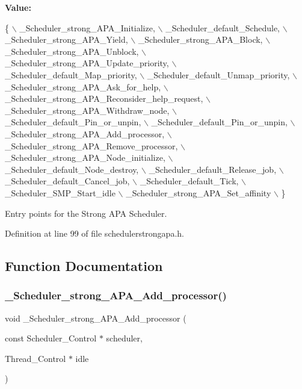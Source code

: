 {\bfseries Value\+:}
\begin{DoxyCode}
\{ \(\backslash\)
    \_Scheduler\_strong\_APA\_Initialize, \(\backslash\)
    \_Scheduler\_default\_Schedule, \(\backslash\)
    \_Scheduler\_strong\_APA\_Yield, \(\backslash\)
    \_Scheduler\_strong\_APA\_Block, \(\backslash\)
    \_Scheduler\_strong\_APA\_Unblock, \(\backslash\)
    \_Scheduler\_strong\_APA\_Update\_priority, \(\backslash\)
    \_Scheduler\_default\_Map\_priority, \(\backslash\)
    \_Scheduler\_default\_Unmap\_priority, \(\backslash\)
    \_Scheduler\_strong\_APA\_Ask\_for\_help, \(\backslash\)
    \_Scheduler\_strong\_APA\_Reconsider\_help\_request, \(\backslash\)
    \_Scheduler\_strong\_APA\_Withdraw\_node, \(\backslash\)
    \_Scheduler\_default\_Pin\_or\_unpin, \(\backslash\)
    \_Scheduler\_default\_Pin\_or\_unpin, \(\backslash\)
    \_Scheduler\_strong\_APA\_Add\_processor, \(\backslash\)
    \_Scheduler\_strong\_APA\_Remove\_processor, \(\backslash\)
    \_Scheduler\_strong\_APA\_Node\_initialize, \(\backslash\)
    \_Scheduler\_default\_Node\_destroy, \(\backslash\)
    \_Scheduler\_default\_Release\_job, \(\backslash\)
    \_Scheduler\_default\_Cancel\_job, \(\backslash\)
    \_Scheduler\_default\_Tick, \(\backslash\)
    \_Scheduler\_SMP\_Start\_idle \(\backslash\)
    \_Scheduler\_strong\_APA\_Set\_affinity \(\backslash\)
  \}
\end{DoxyCode}


Entry points for the Strong A\+PA Scheduler. 



Definition at line 99 of file schedulerstrongapa.\+h.



\subsection{Function Documentation}
\mbox{\label{group__RTEMSScoreSchedulerStrongAPA_ga6ac09dac24785561fd7c5ee5bbd8f5ca}} 
\subsubsection{\texorpdfstring{\+\_\+\+Scheduler\+\_\+strong\+\_\+\+A\+P\+A\+\_\+\+Add\+\_\+processor()}{\_Scheduler\_strong\_APA\_Add\_processor()}}
{\footnotesize\ttfamily void \+\_\+\+Scheduler\+\_\+strong\+\_\+\+A\+P\+A\+\_\+\+Add\+\_\+processor (\begin{DoxyParamCaption}\item[{const Scheduler\+\_\+\+Control $\ast$}]{scheduler,  }\item[{Thread\+\_\+\+Control $\ast$}]{idle }\end{DoxyParamCaption})}




